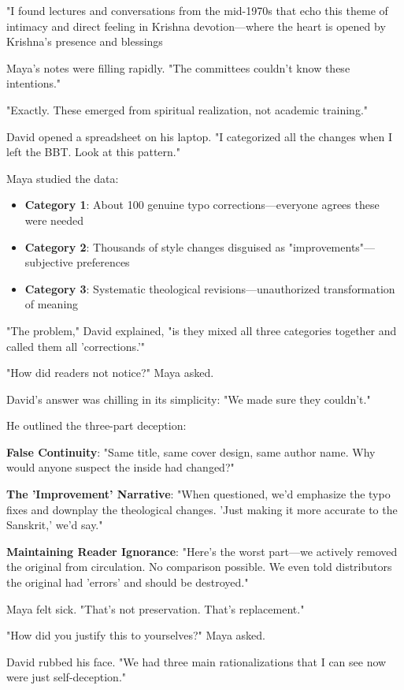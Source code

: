 \documentclass[12pt,twoside]{book}
\begin{document}
"I found lectures and conversations from the mid-1970s that echo this theme of intimacy and direct feeling in Krishna devotion—where the heart is opened by Krishna’s presence and blessings

Maya's notes were filling rapidly. "The committees couldn't know these intentions."

"Exactly. These emerged from spiritual realization, not academic training."

David opened a spreadsheet on his laptop. "I categorized all the changes when I left the BBT. Look at this pattern."

Maya studied the data:
\begin{itemize}
\item \textbf{\textbf{Category 1}}: About 100 genuine typo corrections—everyone agrees these were needed
\item \textbf{\textbf{Category 2}}: Thousands of style changes disguised as "improvements"—subjective preferences
\item \textbf{\textbf{Category 3}}: Systematic theological revisions—unauthorized transformation of meaning
\end{itemize}

"The problem," David explained, "is they mixed all three categories together and called them all 'corrections.'"

"How did readers not notice?" Maya asked.

David's answer was chilling in its simplicity: "We made sure they couldn't."

He outlined the three-part deception:

\textbf{\textbf{False Continuity}}: "Same title, same cover design, same author name. Why would anyone suspect the inside had changed?"

\textbf{\textbf{The 'Improvement' Narrative}}: "When questioned, we'd emphasize the typo fixes and downplay the theological changes. 'Just making it more accurate to the Sanskrit,' we'd say."

\textbf{\textbf{Maintaining Reader Ignorance}}: "Here's the worst part—we actively removed the original from circulation. No comparison possible. We even told distributors the original had 'errors' and should be destroyed."

Maya felt sick. "That's not preservation. That's replacement."

"How did you justify this to yourselves?" Maya asked.

David rubbed his face. "We had three main rationalizations that I can see now were just self-deception."
\end{document}
